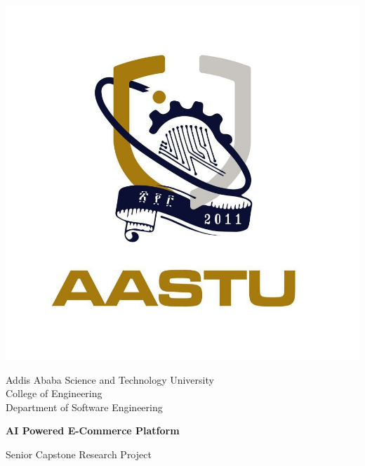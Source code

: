 \documentclass[12pt]{report}
\begin{document}
\begin{titlepage}
	\setlength{\parskip}{0pt}
	\singlespacing
	\begin{center}
		\includegraphics[width=0.4\linewidth]{aastu}

		\Large
		Addis Ababa Science and Technology University \\
		College of Engineering \\
		Department of Software Engineering

		\vspace*{1.5cm}

		\Huge
		\textbf{AI Powered E-Commerce Platform}

		\vspace{0.25cm}

		\LARGE
		Senior Capstone Research Project

		\vspace{1.25cm}

		\vfill
	\end{center}
\end{titlepage}
\end{document}
